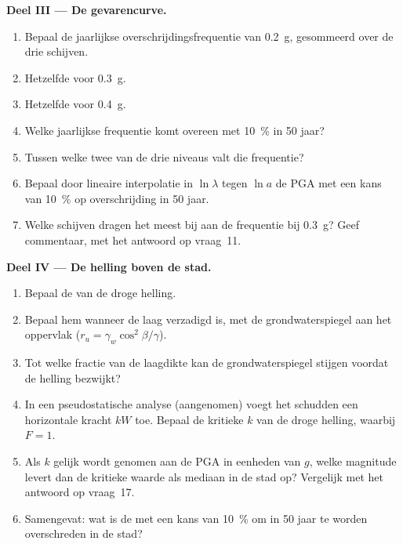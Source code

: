 \begin{problem}
\noindent\textbf{Deel III --- De gevarencurve.}
\begin{enumerate}[resume]
  \item Bepaal de jaarlijkse overschrijdingsfrequentie van \qty{0.2}{g}, gesommeerd over de drie schijven.
  \item Hetzelfde voor \qty{0.3}{g}.
  \item Hetzelfde voor \qty{0.4}{g}.
  \item Welke jaarlijkse frequentie komt overeen met \qty{10}{\percent} in 50 jaar?
  \item Tussen welke twee van de drie niveaus valt die frequentie?
  \item Bepaal door lineaire interpolatie in $\ln\lambda$ tegen $\ln a$ de PGA met een
        kans van \qty{10}{\percent} op overschrijding in 50 jaar.
  \item Welke schijven dragen het meest bij aan de frequentie bij \qty{0.3}{g}? Geef commentaar, met het antwoord op
        vraag~11.
\end{enumerate}

\noindent\textbf{Deel IV --- De helling boven de stad.}
\begin{enumerate}[resume]
  \item Bepaal de  van de droge helling.
  \item Bepaal hem wanneer de laag verzadigd is, met de grondwaterspiegel aan het oppervlak ($r_u =
        \gamma_w\cos^2\beta/\gamma$).
  \item Tot welke fractie van de laagdikte kan de grondwaterspiegel stijgen voordat de helling bezwijkt?
  \item In een pseudostatische analyse (aangenomen) voegt het schudden een horizontale kracht $kW$ toe. Bepaal de
        kritieke $k$ van de droge helling, waarbij $F = 1$.
  \item Als $k$ gelijk wordt genomen aan de PGA in eenheden van $g$, welke magnitude levert dan de kritieke waarde als
        mediaan in de stad op? Vergelijk met het antwoord op vraag~17.
  \item Samengevat: wat is de  met een kans van \qty{10}{\percent} om in 50 jaar
        te worden overschreden in de stad?
\end{enumerate}
\end{problem}
